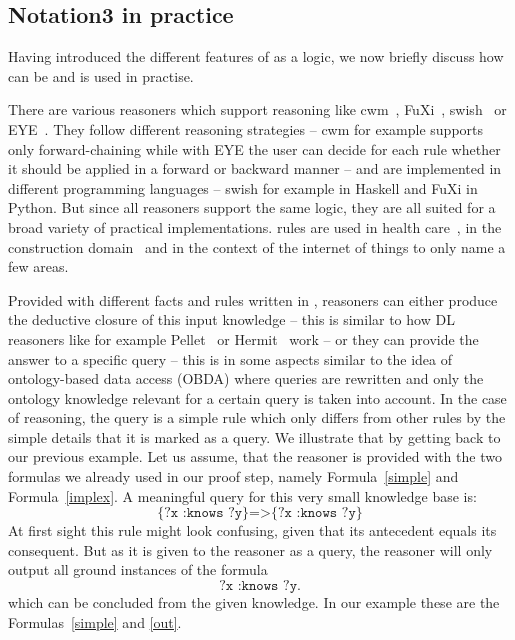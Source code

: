 



\subsection{Notation3 in practice}
\sloppy
Having introduced the different features of \nthree as a logic, we now briefly discuss how \nthree can be and is used in practise. 
% 

There are various reasoners which support \nthree reasoning like cwm~\cite{cwm}, FuXi~\cite{fuxi}, swish~\cite{swish} or EYE~\cite{eye}. They follow different reasoning strategies
--
cwm for example supports only  forward-chaining while with EYE the user can decide for each rule whether it should be applied in a forward or backward manner -- and are implemented 
in different programming languages -- swish for example in Haskell and FuXi in Python. But since all reasoners support the same logic, they are all suited for 
a broad variety of practical 
implementations. \nthree rules are used in health care~\cite{sun,dou}, in the construction domain~\cite{bau} and in the context of the internet of things \cite{iot} 
to only name a few areas.

Provided with different facts and rules written in \nthree, reasoners can either produce the deductive closure of this input knowledge -- this is similar to how \owl DL reasoners
like for example 
Pellet~\cite{Pellet} or Hermit~\cite{hermit} work -- or they can provide the answer to a specific query -- this is in some aspects similar to the idea of 
ontology-based data access (OBDA) \cite{obda} where queries are rewritten and only the ontology knowledge relevant for a certain query is taken into account. 
In the case of \nthree reasoning, the query is a simple \nthree rule which only differs from other rules by the simple details that it is marked as a query. We illustrate that by getting back to our previous example.
Let us assume, that the reasoner is provided with the two formulas we already used in our proof step, namely Formula~\ref{simple} and Formula~\ref{implex}. A meaningful query for this very small knowledge base is:
\begin{equation}
 \texttt{\{?x :knows ?y\}=>\{?x :knows ?y\}}
\end{equation}
At first sight this rule might look confusing, given that its antecedent equals its consequent. But as it is given to the reasoner as a query, the reasoner will only output all ground instances of the 
formula 
\[
 \texttt{?x :knows ?y.}
\]
which can be concluded from the given knowledge. In our example these are the Formulas~\ref{simple} and \ref{out}. 


